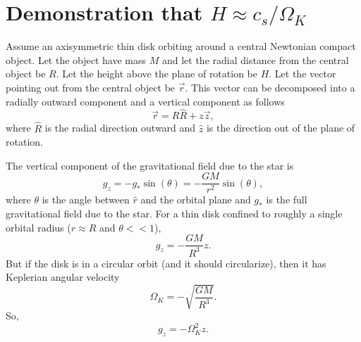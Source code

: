 \documentclass[]{article}
\begin{document}
\appendix
\section{Demonstration that $H\approx c_s/\Omega_K$}
\label{app:H:relation}

Assume an axisymmetric thin disk orbiting around a central Newtonian
compact object. Let the object have mass $M$ and let the radial
distance from the central object be $R$. Let the height above the
plane of rotation be $H$. Let the vector pointing out from the central
object be $\vec{r}$. This vector can be decomposed into a radially
outward component and a vertical component as follows
\begin{equation}
  \label{eq:r:decomposition}
  \vec{r} = R\hat{R} + z\vec{z},
\end{equation}
where $\hat{R}$ is the radial direction outward and $\hat{z}$ is the
direction out of the plane of rotation.

The vertical component of the gravitational field due to the star is
\begin{equation}
  \label{eq:vertical_field}
  g_z = -g_* \sin(\theta) = -\frac{G M}{r^2}\sin(\theta),
\end{equation}
where $\theta$ is the angle between $\hat{r}$ and the orbital plane
and $g_*$ is the full gravitational field due to the
star\cite{ThortonMarion}. For a thin disk confined to roughly a single
orbital radius ($r\approx R$ and $\theta << 1$),
\begin{equation}
  \label{eq:gz:new}
  g_z = -\frac{G M}{R^3} z.
\end{equation}
But if the disk is in a circular orbit (and it should circularize),
then it has Keplerian angular velocity \cite{ThortonMarion}
\begin{equation}
  \label{eq:keplerian:angular:velocity:appendix}
  \Omega_K = -\sqrt{\frac{GM}{R^3}}.
\end{equation}
So, 
\begin{equation}
  \label{eq:gz:final}
  g_z = -\Omega_K^2 z.
\end{equation}
\end{document}
